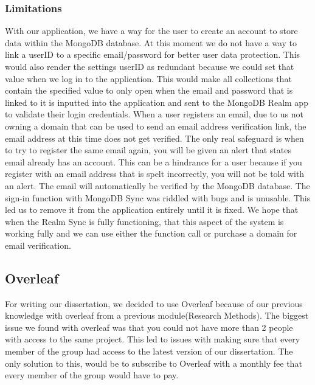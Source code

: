 \subsubsection{Limitations}
With our application, we have a way for the user to create an account to store data within the MongoDB database. At this moment we do not have a way to link a userID to a specific email/password for better user data protection.
\newline
\newline
This would also render the settings userID as redundant because we could set that value when we log in to the application. This would make all collections that contain the specified value to only open when the email and password that is linked to it is inputted into the application and sent to the MongoDB Realm app to validate their login credentials.
\newline
\newline
When a user registers an email, due to us not owning a domain that can be used to send an email address verification link, the email address at this time does not get verified. The only real safeguard is when to try to register the same email again, you will be given an alert that states email already has an account.
\newline
\newline
This can be a hindrance for a user because if you register with an email address that is spelt incorrectly, you will not be told with an alert. The email will automatically be verified by the MongoDB database. The sign-in function with MongoDB Sync was riddled with bugs and is unusable. This led us to remove it from the application entirely until it is fixed. 
\newline
\newline
We hope that when the Realm Sync is fully functioning, that this aspect of the system is working fully and we can use either the function call or purchase a domain for email verification.
\subsection{Overleaf}
For writing our dissertation, we decided to use Overleaf because of our previous knowledge with overleaf from a previous module(Research Methods). The biggest issue we found with overleaf was that you could not have more than 2 people with access to the same project. This led to issues with making sure that every member of the group had access to the latest version of our dissertation. The only solution to this, would be to subscribe to Overleaf with a monthly fee that every member of the group would have to pay.  
\newline
\newline

